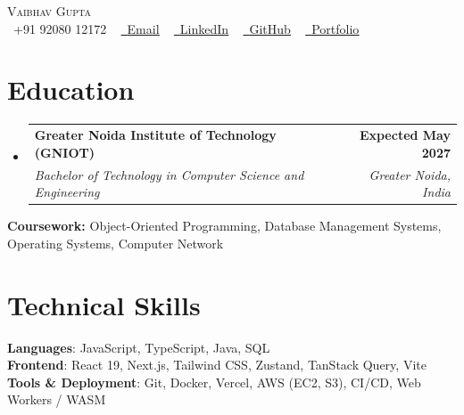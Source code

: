 \documentclass[letterpaper,10pt]{article}
\makeatletter
\newcommand{\resumeSubheading}[4]{
  \vspace{-2pt}\item
    \begin{tabular*}{1.0\textwidth}[t]{l@{\extracolsep{\fill}}r}
      \textbf{#1} & \textbf{\small #2} \\
      \textit{\small#3} & \textit{\small #4} \\
    \end{tabular*}\vspace{-7pt}
}
\newcommand{\resumeSubHeadingListStart}{\begin{itemize}[leftmargin=0.0in, label={}]}
\newcommand{\resumeSubHeadingListEnd}{\end{itemize}}
\makeatother
\begin{document}

\begin{center}
    {\Huge \scshape Vaibhav Gupta} \\ \vspace{1pt}
    \small \raisebox{-0.1\height}\faPhone\ +91 92080 12172 ~
    \href{mailto:vaibhv19.business@gmail.com}{\raisebox{-0.2\height}\faEnvelope\ \underline{Email}} ~
    \href{https://linkedin.com/in/vaibhv19}{\raisebox{-0.2\height}\faLinkedin\ \underline{LinkedIn}} ~
    \href{https://github.com/vaibhv19}{\raisebox{-0.2\height}\faGithub\ \underline{GitHub}} ~
    \href{https://vaibhv19.dev}{\raisebox{-0.2\height}\faGlobe\ \underline{Portfolio}}
    \vspace{-8pt}
\end{center}

\section{Education}
  \resumeSubHeadingListStart
    \resumeSubheading
      {Greater Noida Institute of Technology (GNIOT)}{Expected May 2027}
      {Bachelor of Technology in Computer Science and Engineering}{Greater Noida, India}
  \resumeSubHeadingListEnd
  \vspace{-4pt}
  \begin{itemize}[leftmargin=0in, label={}]
    \small{\item{\textbf{Coursework:} Object-Oriented Programming, Database Management Systems, Operating Systems, Computer Network}}
    \vspace{-10pt}
\end{itemize} 

\section{Technical Skills}
 \begin{itemize}[leftmargin=0in, label={}]
    \small{\item{
     \textbf{Languages}{: JavaScript, TypeScript, Java, SQL} \\
     \textbf{Frontend}{: React 19, Next.js, Tailwind CSS, Zustand, TanStack Query, Vite} \\
     \textbf{Tools \& Deployment}{: Git, Docker, Vercel, AWS (EC2, S3), CI/CD, Web Workers / WASM} \\
    }}
 \end{itemize}
 \vspace{-12pt}
 
\end{document}
